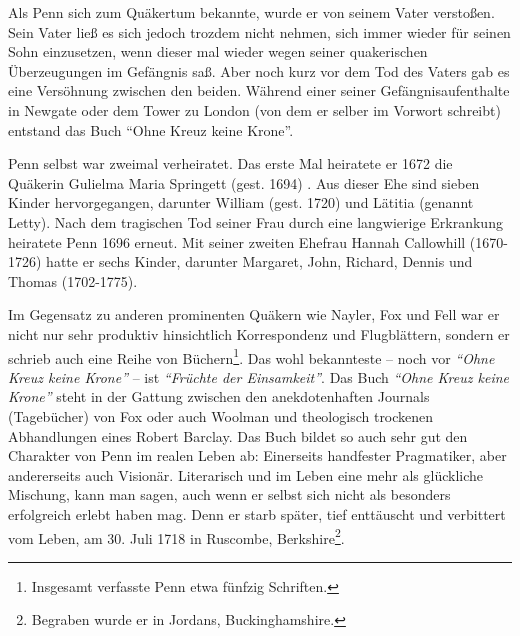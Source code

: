 Als Penn sich zum Quäkertum bekannte, wurde er von seinem Vater verstoßen.
Sein Vater ließ es sich jedoch trozdem nicht nehmen, sich immer wieder für seinen
Sohn einzusetzen, wenn dieser mal wieder
wegen seiner quakerischen Überzeugungen im Gefängnis saß. Aber noch
kurz vor dem Tod des Vaters gab es eine Versöhnung zwischen den beiden. Während
einer seiner Gefängnisaufenthalte in Newgate  oder dem Tower zu London (von dem er selber im Vorwort schreibt) entstand
das Buch "`Ohne Kreuz keine Krone"'.

\medskip

Penn selbst war zweimal verheiratet. Das erste Mal heiratete er 1672 die
Quäkerin Gulielma Maria Springett (gest. 1694)
. Aus dieser Ehe sind sieben Kinder
hervorgegangen, darunter William (gest. 1720) und Lätitia (genannt Letty). Nach dem tragischen Tod seiner Frau
durch eine langwierige Erkrankung heiratete Penn 1696 erneut. Mit seiner zweiten
Ehefrau Hannah Callowhill (1670-1726) hatte
er sechs Kinder, darunter Margaret, John, Richard, Dennis und Thomas (1702-1775).

\medskip

Im Gegensatz zu anderen prominenten Quäkern wie Nayler, Fox und Fell war er nicht nur sehr produktiv hinsichtlich Korrespondenz und
Flugblättern, sondern er schrieb auch eine Reihe von
Büchern\footnote{Insgesamt verfasste Penn etwa fünfzig Schriften.}.
Das wohl bekannteste -- noch vor \textit{"`Ohne Kreuz keine Krone"'} -- ist
\textit{"`Früchte der Einsamkeit"'}. Das Buch \textit{"`Ohne Kreuz keine
Krone"'} steht in der Gattung zwischen den anekdotenhaften Journals
(Tagebücher) von Fox
oder auch Woolman und theologisch trockenen
Abhandlungen eines Robert Barclay. Das Buch
bildet so auch sehr gut den Charakter von Penn im realen Leben ab: Einerseits
handfester Pragmatiker, aber andererseits auch Visionär. Literarisch und im Leben
eine mehr als glückliche Mischung, kann man sagen, auch wenn er selbst sich
nicht als besonders erfolgreich erlebt haben mag. Denn er starb später, tief
enttäuscht und verbittert vom Leben, am 30. Juli 1718 in Ruscombe, Berkshire\footnote{Begraben wurde er in
Jordans, Buckinghamshire. }.

